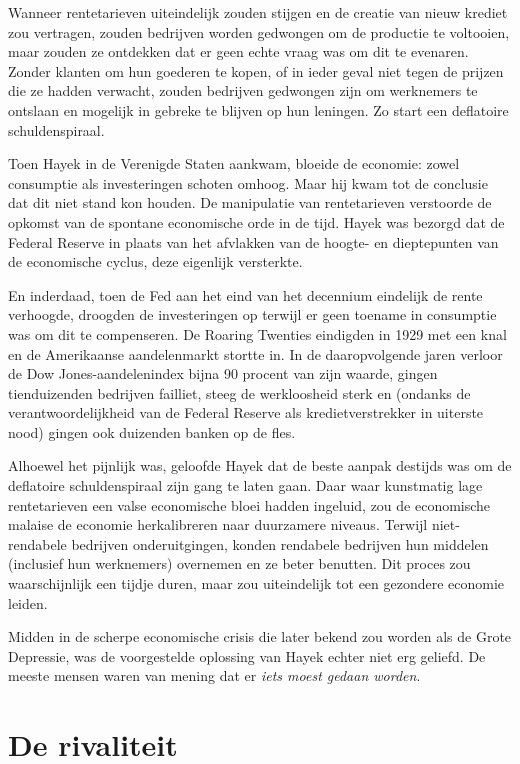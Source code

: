 \documentclass[smalldemyvopaper,11pt,twoside,onecolumn,openright,extrafontsizes,hidelinks]{memoir}
\begin{document}
Wanneer rentetarieven uiteindelijk zouden stijgen en de creatie van
nieuw krediet zou vertragen, zouden bedrijven worden gedwongen om de
productie te voltooien, maar zouden ze ontdekken dat er geen echte vraag
was om dit te evenaren. Zonder klanten om hun goederen te kopen, of in
ieder geval niet tegen de prijzen die ze hadden verwacht, zouden
bedrijven gedwongen zijn om werknemers te ontslaan en mogelijk in
gebreke te blijven op hun leningen. Zo start een deflatoire
schuldenspiraal.

Toen Hayek in de Verenigde Staten aankwam, bloeide de economie: zowel
consumptie als investeringen schoten omhoog. Maar hij kwam tot de
conclusie dat dit niet stand kon houden. De manipulatie van
rentetarieven verstoorde de opkomst van de spontane economische orde in
de tijd. Hayek was bezorgd dat de Federal Reserve in plaats van het
afvlakken van de hoogte- en dieptepunten van de economische cyclus, deze
eigenlijk versterkte.

En inderdaad, toen de Fed aan het eind van het decennium eindelijk de
rente verhoogde, droogden de investeringen op terwijl er geen toename in
consumptie was om dit te compenseren. De Roaring Twenties eindigden in
1929 met een knal en de Amerikaanse aandelenmarkt stortte in. In de
daaropvolgende jaren verloor de Dow Jones-aandelenindex bijna 90 procent
van zijn waarde, gingen tienduizenden bedrijven failliet, steeg de
werkloosheid sterk en (ondanks de verantwoordelijkheid van de Federal
Reserve als kredietverstrekker in uiterste nood) gingen ook duizenden
banken op de fles.

Alhoewel het pijnlijk was, geloofde Hayek dat de beste aanpak destijds
was om de deflatoire schuldenspiraal zijn gang te laten gaan. Daar waar
kunstmatig lage rentetarieven een valse economische bloei hadden
ingeluid, zou de economische malaise de economie herkalibreren naar
duurzamere niveaus. Terwijl niet-rendabele bedrijven onderuitgingen,
konden rendabele bedrijven hun middelen (inclusief hun werknemers)
overnemen en ze beter benutten. Dit proces zou waarschijnlijk een tijdje
duren, maar zou uiteindelijk tot een gezondere economie leiden.

Midden in de scherpe economische crisis die later bekend zou worden als
de Grote Depressie, was de voorgestelde oplossing van Hayek echter niet
erg geliefd. De meeste mensen waren van mening dat er \emph{iets moest
gedaan worden}.

\section{De rivaliteit}\label{de-rivaliteit}
\end{document}
